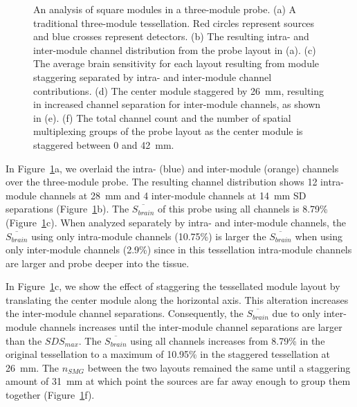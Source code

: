 \begin{figure}
\begin{center}
\end{center}
\caption {An analysis of square modules in a three-module probe. (a) A traditional three-module tessellation. Red circles represent sources and blue crosses represent detectors. (b) The resulting intra- and inter-module channel distribution from the probe layout in (a). (c) The average brain sensitivity for each layout resulting from module staggering separated by intra- and inter-module channel contributions. (d) The center module staggered by 26~mm, resulting in increased channel separation for inter-module channels, as shown in (e). (f) The total channel count and the number of spatial multiplexing groups of the probe layout as the center module is staggered between 0 and 42~mm.}
 \label{fig:stagger}
\end{figure} 

In Figure~\ref{fig:stagger}a, we overlaid the intra- (blue) and inter-module (orange) channels over the three-module probe. The resulting channel distribution shows 12 intra-module channels at 28~mm and 4 inter-module channels at 14~mm \ac{SD} separations (Figure~\ref{fig:stagger}b). The $\overline{S_{brain}}$ of this probe using all channels is 8.79\% (Figure~\ref{fig:stagger}c). When analyzed separately by intra- and inter-module channels, the $\overline{S_{brain}}$ using only intra-module channels (10.75\%) is larger the $\overline{S_{brain}}$ when using only inter-module channels (2.9\%) since in this tessellation intra-module channels are larger and probe deeper into the tissue.  

In Figure~\ref{fig:stagger}c, we show the effect of staggering the tessellated module layout by translating the center module along the horizontal axis. This alteration increases the inter-module channel separations. Consequently, the $\overline{S_{brain}}$ due to only inter-module channels increases until the inter-module channel separations are larger than the $SDS_{max}$. The $\overline{S_{brain}}$ using all channels increases from 8.79\% in the original tessellation to a maximum of 10.95\% in the staggered tessellation at 26~mm. The $n_{SMG}$ between the two layouts remained the same until a staggering amount of 31~mm at which point the sources are far away enough to group them together (Figure~\ref{fig:stagger}f). 




